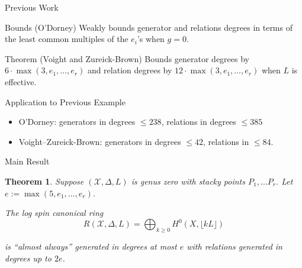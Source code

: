 \documentclass{beamer}
\newtheorem{thm}{Theorem}
\theoremstyle{remark}
\newcommand \sx{{\mathscr X}}
\newcommand{\halfcan}{L}
\begin{document}

\begin{frame}{Previous Work}
\begin{block}{Bounds (O'Dorney)}
Weakly bounds generator and relations degrees in terms of
the least common multiples of the $e_i$'s when $g = 0$.
\end{block}

\begin{block}{Theorem (Voight and Zureick-Brown)}
Bounds generator degrees by $6
\cdot \max(3, e_1, \ldots, e_r)$ and relation degrees by $12 \cdot \max
(3, e_1, \ldots, e_ r)$ when $\halfcan$ is effective.
\end{block}

\begin{block}{Application to Previous Example}
\begin{itemize}
\item O'Dorney: generators in degrees $\leq 238$, relations in degrees $\leq 385$
\item Voight--Zureick-Brown: generators in degrees $\leq 42$, relations in $\leq 84$.
\end{itemize}
\end{block}

\end{frame}


\begin{frame}{Main Result}
\begin{thm}
\label{thm:main}
Suppose $(\sx, \Delta, \halfcan)$ is genus zero with stacky points $P_1, \ldots P_r$.  Let $e := \max(5, e_1, \ldots, e_r)$.

The log spin canonical ring 
\[
	R(\sx, \Delta, \halfcan) = \bigoplus_{k \geq 0} H^0(X, \lfloor k \halfcan \rfloor)
\]

\noindent
is ``almost always'' generated in degrees at most $e$ with
relations generated in degrees up to $2e$.
\end{thm}
\end{frame}

\end{document}
